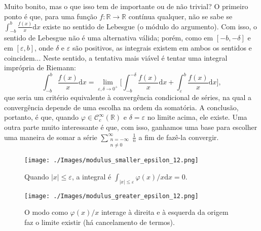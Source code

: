 \documentclass[../distribution_theory_notes.tex]{subfiles}
\begin{document}
Muito bonito, mas o que isso tem de importante ou de não trivial? O primeiro ponto é que, para uma função \(f:\mathbb{R}\rightarrow \mathbb{R}\) contínua qualquer, não se sabe se \(\int_{-b}^{b}\frac{f(x)}{x} \mathrm{d}x\) existe no sentido de Lebesgue (o módulo do argumento). Com isso, o sentido de Lebesgue não é uma alternativa válida; porém, como em \([-b, -\delta ]\) e em \([\varepsilon , b]\), onde \(\delta \) e \(\varepsilon \) são positivos, as integrais existem em ambos os sentidos e coincidem... Neste sentido, a tentativa mais viável é tentar uma integral imprópria de Riemann:
\[
	\int_{-b}^{b}\frac{f(x)}{x} \mathrm{d}x = \lim_{\varepsilon , \delta \to 0^{+}} \biggl[\int_{-b}^{-\delta }\frac{f(x)}{x} \mathrm{d}x + \int_{\varepsilon }^{b} \frac{f(x)}{x} \mathrm{d}x\biggr],
\]
que seria um critério equivalente à convergência condicional de séries, na qual a convergência depende de uma escolha na ordem da somatória. A conclusão, portanto, é que, quando \(\varphi \in \mathcal{C}_{c}^{\infty}(\mathbb{R})\) e \(\delta =\varepsilon \) no limite acima, ele existe. Uma outra parte muito interessante é que, com isso, ganhamos uma base para escolher uma maneira de somar a série \(\sum\limits_{\substack{n=-\infty \\ n\neq 0}}^{\infty}\frac{1}{n}\) a fim de fazê-la convergir.

\begin{figure}[H]
	\begin{center}
		\texttt{[image: ./Images/modulus\_smaller\_epsilon\_12.png]}
	\end{center}
	\caption{Quando \(| x |\leq \varepsilon \), a integral é \(\int_{| x |\leq \varepsilon }^{}\varphi(x)/x \mathrm{d}x=0\).}
\end{figure}

\begin{figure}[H]
	\begin{center}
		\texttt{[image: ./Images/modulus\_greater\_epsilon\_12.png]}
	\end{center}
	\caption{O modo como \(\varphi (x)/x\) interage à direita e à esquerda da origem faz o limite existir (há cancelamento de termos).}
\end{figure}
\end{document}
